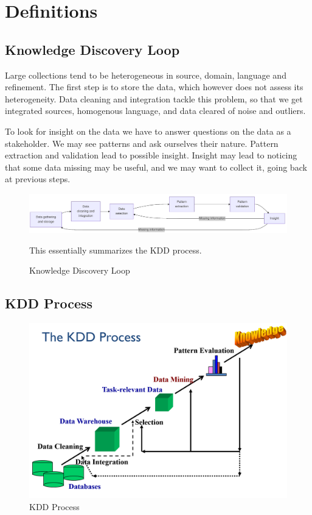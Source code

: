 \section{Definitions}

\subsection{Knowledge Discovery Loop}
Large collections tend to be heterogeneous in source, domain, language and refinement.
The first step is to store the data, which however does not assess its heterogeneity.
Data cleaning and integration tackle this problem, so that we get integrated sources, homogenous language, and data cleared of noise and outliers.

To look for insight on the data we have to answer questions on the data as a stakeholder. We may see patterns and ask ourselves their nature.
Pattern extraction and validation lead to possible insight.
Insight may lead to noticing that some data missing may be useful, and we may want to collect it, going back at previous steps.

\begin{figure}[htbp]
   \centering
   \includegraphics{images/01/knowledgeDiscoveryLoop.png}
   \caption{Knowledge Discovery Loop}
   This essentially summarizes the KDD process.
   
   \label{fig:01/knowledgeDiscoveryLoop}
\end{figure}


\subsection{KDD Process}
\begin{figure}[htbp]
   \centering
   \includegraphics{images/01/KDDprocess.png}
   \caption{KDD Process}
   \label{fig:01/KDDprocess}
\end{figure}

